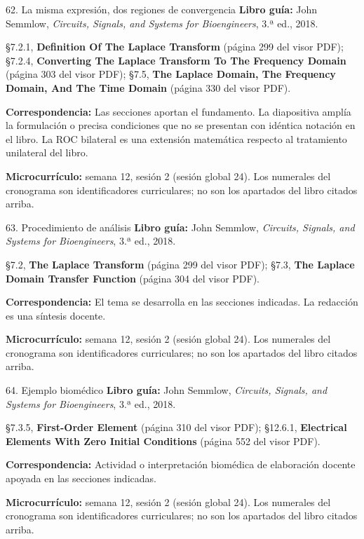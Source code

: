 \documentclass[
  10pt,
  ignorenonframetext,
  aspectratio=169,
  spanish,
]{beamer}
\begin{document}
\begin{frame}{62. La misma expresión, dos regiones de convergencia}
\label{la-misma-expresiuxf3n-dos-regiones-de-convergencia}
\textbf{Libro guía:} John Semmlow, \emph{Circuits, Signals, and Systems
for Bioengineers}, 3.ª ed., 2018.

§7.2.1, \textbf{Definition Of The Laplace Transform} (página 299 del
visor PDF); §7.2.4, \textbf{Converting The Laplace Transform To The
Frequency Domain} (página 303 del visor PDF); §7.5, \textbf{The Laplace
Domain, The Frequency Domain, And The Time Domain} (página 330 del visor
PDF).

\textbf{Correspondencia:} Las secciones aportan el fundamento. La
diapositiva amplía la formulación o precisa condiciones que no se
presentan con idéntica notación en el libro. La ROC bilateral es una
extensión matemática respecto al tratamiento unilateral del libro.

\textbf{Microcurrículo:} semana 12, sesión 2 (sesión global 24). Los
numerales del cronograma son identificadores curriculares; no son los
apartados del libro citados arriba.
\end{frame}

\begin{frame}{63. Procedimiento de análisis}
\label{procedimiento-de-anuxe1lisis-3}
\textbf{Libro guía:} John Semmlow, \emph{Circuits, Signals, and Systems
for Bioengineers}, 3.ª ed., 2018.

§7.2, \textbf{The Laplace Transform} (página 299 del visor PDF); §7.3,
\textbf{The Laplace Domain Transfer Function} (página 304 del visor
PDF).

\textbf{Correspondencia:} El tema se desarrolla en las secciones
indicadas. La redacción es una síntesis docente.

\textbf{Microcurrículo:} semana 12, sesión 2 (sesión global 24). Los
numerales del cronograma son identificadores curriculares; no son los
apartados del libro citados arriba.
\end{frame}

\begin{frame}{64. Ejemplo biomédico}
\label{ejemplo-biomuxe9dico-3}
\textbf{Libro guía:} John Semmlow, \emph{Circuits, Signals, and Systems
for Bioengineers}, 3.ª ed., 2018.

§7.3.5, \textbf{First-Order Element} (página 310 del visor PDF);
§12.6.1, \textbf{Electrical Elements With Zero Initial Conditions}
(página 552 del visor PDF).

\textbf{Correspondencia:} Actividad o interpretación biomédica de
elaboración docente apoyada en las secciones indicadas.

\textbf{Microcurrículo:} semana 12, sesión 2 (sesión global 24). Los
numerales del cronograma son identificadores curriculares; no son los
apartados del libro citados arriba.
\end{frame}
\end{document}

